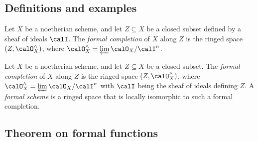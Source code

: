 \subsection{Definitions and examples}

    \begin{definition}\label{def:formal_completion}
        Let \(X\) be a noetherian scheme, and let \(Z\subseteq X\) be a closed subset defined by a sheaf of ideals \(\calI\).
        The \emph{formal completion} of \(X\) along \(Z\) is the ringed space \((Z, \calO_X^{\wedge})\), where \(\calO_X^{\wedge} = \varprojlim \calO_X/\calI^n\).
    \end{definition}

    \begin{definition}\label{def:formal_schemes}
        Let \(X\) be a noetherian scheme, and let \(Z\subseteq X\) be a closed subset. 
        The \emph{formal completion} of \(X\) along \(Z\) is the ringed space \((Z, \calO_X^{\wedge})\), where \(\calO_X^{\wedge} = \varprojlim \calO_X/\calI^n\) with \(\calI\) being the sheaf of ideals defining \(Z\).
        A \emph{formal scheme} is a ringed space that is locally isomorphic to such a formal completion.
    \end{definition}


\subsection{Theorem on formal functions}

    \begin{theorem}\label{thm:theorem_on_formal_functions}
        
    \end{theorem}

